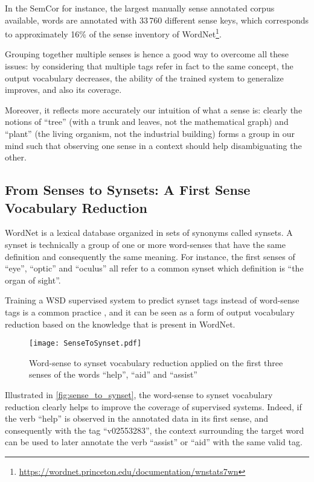 \documentclass[11pt,a4paper]{article}
\begin{document}
In the SemCor \citep{Miller1993} for instance, the largest manually sense annotated corpus available, 
words are annotated with 33\,760 different sense keys, which corresponds to approximately 16\% of the sense inventory of WordNet\footnote{\url{https://wordnet.princeton.edu/documentation/wnstats7wn}}.

Grouping together multiple senses is hence a good way to overcome all these issues: by considering that multiple tags refer in fact to the same concept, the output vocabulary decreases, the ability of the trained system to generalize improves, and also its coverage.

Moreover, it reflects more accurately our intuition of what a sense is: clearly the notions of ``tree'' (with a trunk and leaves, not the mathematical graph) and ``plant'' (the living organism, not the industrial building) forms a group in our mind such that observing one sense in a context should help disambiguating the other. 









\subsection{From Senses to Synsets: A First Sense Vocabulary Reduction}

WordNet is a lexical database organized in sets of synonyms called synsets. A synset is technically a group of one or more word-senses that have the same definition and consequently the same meaning. For instance, the first senses of ``eye'', ``optic'' and ``oculus'' all refer to a common synset which definition is ``the organ of sight''.



Training a WSD supervised system to predict synset tags instead of word-sense tags is a common practice \citep{yuan_2016,minh2018}, and it can be seen as a form of output vocabulary reduction based on the knowledge that is present in WordNet.

\begin{figure}[htbp]
\centering
\texttt{[image: SenseToSynset.pdf]}
\caption{Word-sense to synset vocabulary reduction applied on the first three senses of the words ``help'', ``aid'' and ``assist''}
\label{fig:sense_to_synset}
\end{figure}

Illustrated in \autoref{fig:sense_to_synset}, the word-sense to synset vocabulary reduction clearly helps to improve the coverage of supervised systems. Indeed, if the verb ``help'' is observed in the annotated data in its first sense, and consequently with the tag ``v02553283'', the context surrounding the target word can be used to later annotate the verb ``assist'' or ``aid'' with the same valid tag.
\end{document}

